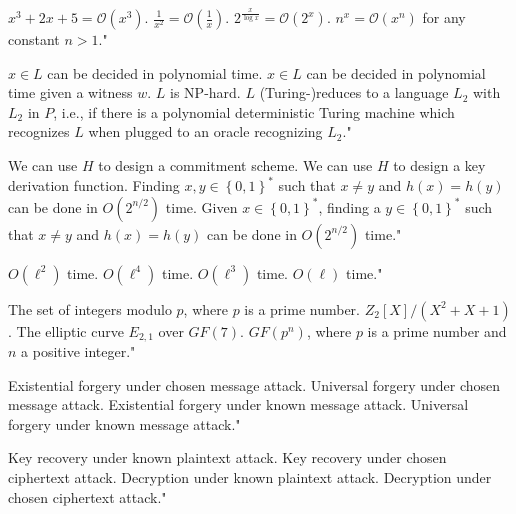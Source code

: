 {$x^3 + 2x + 5 = \mathcal{O}(x^3)$.}
{$\frac{1}{x^2} = \mathcal{O}(\frac{1}{x})$.}
{$2^{\frac{x}{\log x}} = \mathcal{O}(2^x)$.}
{$n^x = \mathcal{O}(x^n)$ for any constant $n>1$."}

{$x \in L$ can be decided in polynomial time.}
{$x \in L$ can be decided in polynomial time given a witness $w$.}
{$L$ is NP-hard.}
{$L$ (Turing-)reduces to a language $L_2$ with $L_2$ in $P$, i.e., if there is a polynomial deterministic Turing machine which recognizes $L$ when plugged to an oracle recognizing $L_2$."}

{We can use $H$ to design a commitment scheme.}
{We can use $H$ to design a key derivation function.}
{Finding $x,y\in\left\{ 0,1 \right\}^*$ such that $x\neq y$ and $h(x) = h(y)$ can be done in $O(2^{n/2})$ time.}
{Given $x\in\left\{ 0,1 \right\}^*$, finding a $y \in \left\{ 0,1 \right\}^*$ such that $x\neq y$ and $h(x) = h(y)$ can be done in $O(2^{n/2})$ time."}

{$O(\ell^2)$ time.}
{$O(\ell^4)$ time.}
{$O(\ell^3)$ time.}
{$O(\ell)$ time."}

{The set of integers modulo $p$, where $p$ is a prime number.}
{$Z_2[X]/(X^2+X+1)$.}
{The elliptic curve $E_{2,1}$ over $GF(7)$.}
{$GF(p^n)$, where $p$ is a prime number and $n$ a positive integer."}

{Existential forgery under chosen message attack.}
{Universal forgery under chosen message attack.}
{Existential forgery under known message attack.}
{Universal forgery under known message attack."}

{Key recovery under known plaintext attack.}
{Key recovery under chosen ciphertext attack.}
{Decryption under known plaintext attack.}
{Decryption under chosen ciphertext attack."}

